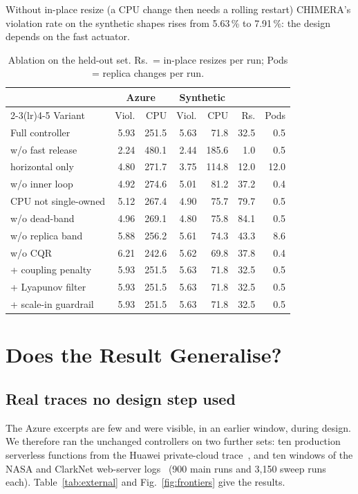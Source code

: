 \documentclass[conference]{IEEEtran}
\begin{document}
Without in-place resize (a CPU change then needs a rolling restart) CHIMERA's violation
rate on the synthetic shapes rises from 5.63\,\% to 7.91\,\%: the design depends on the
fast actuator.

\begin{table}[t]
\caption{Ablation on the held-out set. Rs.\ = in-place resizes per run; Pods = replica
changes per run.}
\label{tab:ablation}
\centering
\setlength{\tabcolsep}{3pt}
\begin{tabular}{@{}lrrrrrr@{}}
\toprule
 & \multicolumn{2}{c}{Azure} & \multicolumn{2}{c}{Synthetic} & & \\
\cmidrule(lr){2-3}\cmidrule(lr){4-5}
Variant & Viol. & CPU & Viol. & CPU & Rs. & Pods \\
\midrule
Full controller & 5.93 & 251.5 & 5.63 & 71.8 & 32.5 & 0.5 \\
w/o fast release & 2.24 & 480.1 & 2.44 & 185.6 & 1.0 & 0.5 \\
horizontal only & 4.80 & 271.7 & 3.75 & 114.8 & 12.0 & 12.0 \\
w/o inner loop & 4.92 & 274.6 & 5.01 & 81.2 & 37.2 & 0.4 \\
CPU not single-owned & 5.12 & 267.4 & 4.90 & 75.7 & 79.7 & 0.5 \\
w/o dead-band & 4.96 & 269.1 & 4.80 & 75.8 & 84.1 & 0.5 \\
w/o replica band & 5.88 & 256.2 & 5.61 & 74.3 & 43.3 & 8.6 \\
w/o CQR & 6.21 & 242.6 & 5.62 & 69.8 & 37.8 & 0.4 \\
\midrule
+ coupling penalty & 5.93 & 251.5 & 5.63 & 71.8 & 32.5 & 0.5 \\
+ Lyapunov filter & 5.93 & 251.5 & 5.63 & 71.8 & 32.5 & 0.5 \\
+ scale-in guardrail & 5.93 & 251.5 & 5.63 & 71.8 & 32.5 & 0.5 \\
\bottomrule
\end{tabular}
\end{table}

\section{Does the Result Generalise?}
\label{sec:general}

\subsection{Real traces no design step used}

The Azure excerpts are few and were visible, in an earlier window, during design. We
therefore ran the unchanged controllers on two further sets: ten production serverless
functions from the Huawei private-cloud trace~\cite{huawei}, and ten windows of the NASA
and ClarkNet web-server logs~\cite{ita} (900 main runs and 3{,}150 sweep runs each).
Table~\ref{tab:external} and Fig.~\ref{fig:frontiers} give the results.
\end{document}
